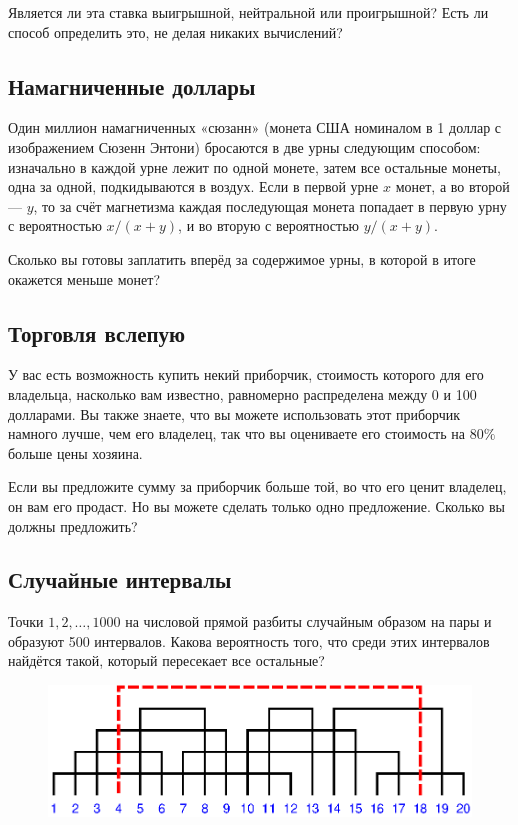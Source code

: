\medskip

Является ли эта ставка выигрышной, нейтральной или проигрышной? Есть ли способ определить это, не делая никаких вычислений?

\subsection*{Намагниченные доллары}%

Один миллион намагниченных «сюзанн» (монета США номиналом в 1 доллар с изображением Сюзенн Энтони) бросаются в две урны следующим способом: изначально в каждой урне лежит по одной монете, затем все остальные монеты, одна за одной, подкидываются в воздух.
Если в первой урне $x$ монет, а во второй --- $y$, то за счёт магнетизма каждая последующая монета попадает в первую урну с вероятностью $x/(x+y)$, и во вторую с вероятностью $y/(x+y)$.

Сколько вы готовы заплатить вперёд за содержимое урны, в которой в итоге окажется меньше монет?

\subsection*{Торговля вслепую}%

У вас есть возможность купить некий приборчик, стоимость которого для его владельца, насколько вам известно, равномерно распределена между 0 и 100 долларами.
Вы также знаете, что вы можете использовать этот приборчик намного лучше, чем его владелец, так что вы оцениваете его стоимость на $80\%$ больше цены хозяина.

\medskip

Если вы предложите сумму за приборчик больше той, во что его ценит владелец, он вам его продаст.
Но вы можете сделать только одно предложение.
Сколько вы должны предложить?

\subsection*{Случайные интервалы}%

Точки $1, 2,\dots, 1000$ на числовой прямой разбиты случайным образом на пары и образуют 500 интервалов.
Какова вероятность того, что среди этих интервалов найдётся такой, который пересекает все остальные?

\begin{figure}[h!]
\centering
\includegraphics[scale=0.8]{Figs/Probability/ints}
\end{figure}
